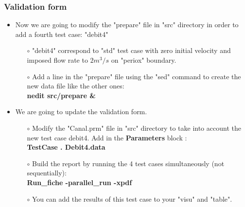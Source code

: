 \documentclass[10pt, hyperref={unicode=true,pdfusetitle, bookmarks=true,bookmarksnumbered=false,bookmarksopen=false, breaklinks=false,pdfborder={0 0 1},backref=true,colorlinks=true,linkcolor=darkblue,pageanchor}]{beamer}
\begin{document}
\begin{frame}
\frametitle{Validation form}
\begin{block}{}

\begin{itemize}
\item Now we are going to modify the "prepare" file in "src" directory in order to add a fourth test case: "debit4"
    \begin{itemize}
    \item [$\circ$] "debit4" correspond to "std" test case with zero initial velocity and imposed flow rate to $2 m^3/s$ on "periox" boundary.
    \item [$\circ$] Add a line in the "prepare" file using the "sed" command to create the new data file like the other ones:\\
    \textbf{nedit src/prepare \& }
    \end{itemize}

\item We are going to update the validation form.
    \begin{itemize}
    \item [$\circ$] Modify the "Canal.prm" file in "src" directory to take into account the new test case debit4. Add in the \textbf{Parameters} block :\\
    \hspace{0.3cm} \textbf{TestCase . Debit4.data}\\

    \item [$\circ$] Build the report by running the 4 test cases simultaneously (not sequentially):\\
    \textbf{Run\_fiche -parallel\_run -xpdf}
    \item [$\circ$] You can add the results of this test case to your "visu" and "table".
    \end{itemize}

\end{itemize}

\end{block}
\end{frame}
\end{document}
